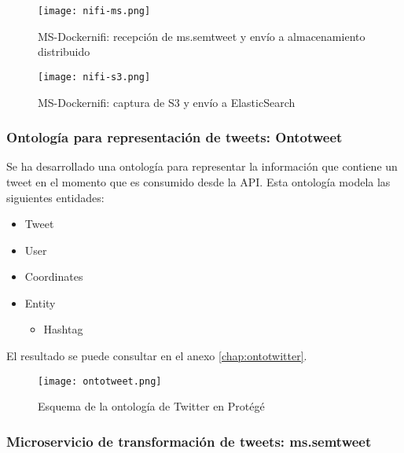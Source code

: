 \begin{figure}[!h]
  \begin{center}
    \texttt{[image: nifi-ms.png]} 
    \caption{MS-Dockernifi: recepción de ms.semtweet y envío a almacenamiento distribuido}
    \label{fig:nifi-ms}
  \end{center}
\end{figure}

\begin{figure}[!h]
  \begin{center}
    \texttt{[image: nifi-s3.png]} 
    \caption{MS-Dockernifi: captura de S3 y envío a ElasticSearch}
    \label{fig:nifi-s3}
  \end{center}
\end{figure}


\subsubsection{Ontología para representación de tweets: Ontotweet}

Se ha desarrollado una ontología para representar la información que contiene un
tweet en el momento que es consumido desde la \acs{API}. Esta ontología modela
las siguientes entidades: 

\begin{itemize}
\item Tweet
\item User
\item Coordinates
\item Entity
  \begin{itemize}
  \item Hashtag
  \end{itemize}
\end{itemize}

El resultado se puede consultar en el anexo \ref{chap:ontotwitter}.

\begin{figure}[!h]
  \begin{center}
    \texttt{[image: ontotweet.png]} 
    \caption{Esquema de la ontología de Twitter en Protégé}
    \label{fig:ontotwitterprotege}
  \end{center}
\end{figure}

\subsubsection{Microservicio de transformación de tweets: ms.semtweet}


